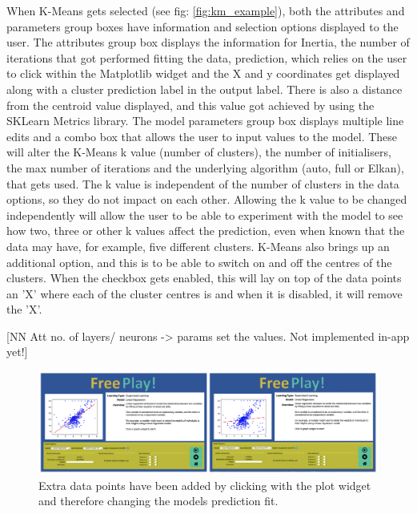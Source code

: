 		When K-Means gets selected (see fig: \ref{fig:km_example}), both the attributes and parameters group boxes have information and selection options displayed to the user. The attributes group box displays the information for Inertia, the number of iterations that got performed fitting the data, prediction, which relies on the user to click within the Matplotlib widget and the X and y coordinates get displayed along with a cluster prediction label in the output label. There is also a distance from the centroid value displayed, and this value got achieved by using the SKLearn Metrics library. The model parameters group box displays multiple line edits and a combo box that allows the user to input values to the model. These will alter the K-Means k value (number of clusters), the number of initialisers, the max number of iterations and the underlying algorithm (auto, full or Elkan), that gets used.  The k value is independent of the number of clusters in the data options, so they do not impact on each other. Allowing the k value to be changed independently will allow the user to be able to experiment with the model to see how two, three or other k values affect the prediction, even when known that the data may have, for example, five different clusters. K-Means also brings up an additional option, and this is to be able to switch on and off the centres of the clusters. When the checkbox gets enabled, this will lay on top of the data points an 'X' where each of the cluster centres is and when it is disabled, it will remove the 'X'.
		
	
		[NN Att no. of layers/ neurons -> params set the values. Not implemented in-app yet!]
		
		\begin{figure}[t]
			\begin{center}
				\includegraphics[width=15cm]{graphics/manipulating_lr_data.png}
				\caption{Extra data points have been added by clicking with the plot widget and therefore changing the models prediction fit.}
				\label{fig:manipulating_lr_data}
			\end{center}
		\end{figure}
	
